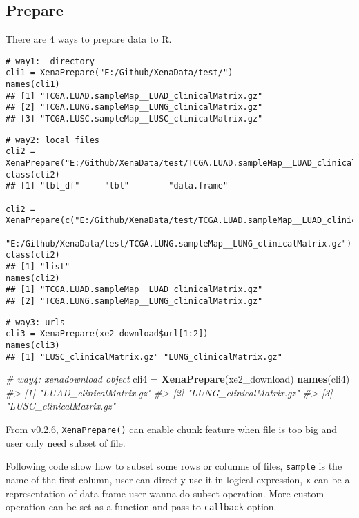 \documentclass[nofonts,]{tufte-handout}
\newenvironment{Shaded}{\begin{snugshade}}{\end{snugshade}}
\newcommand{\CommentTok}[1]{\textcolor[rgb]{0.56,0.35,0.01}{\textit{#1}}}
\newcommand{\KeywordTok}[1]{\textcolor[rgb]{0.13,0.29,0.53}{\textbf{#1}}}
\newcommand{\NormalTok}[1]{#1}
\newcommand{\StringTok}[1]{\textcolor[rgb]{0.31,0.60,0.02}{#1}}
\begin{document}
\hypertarget{prepare}{%
\subsection{Prepare}\label{prepare}}

There are 4 ways to prepare data to R.

\begin{verbatim}
# way1:  directory
cli1 = XenaPrepare("E:/Github/XenaData/test/")
names(cli1)
## [1] "TCGA.LUAD.sampleMap__LUAD_clinicalMatrix.gz"
## [2] "TCGA.LUNG.sampleMap__LUNG_clinicalMatrix.gz"
## [3] "TCGA.LUSC.sampleMap__LUSC_clinicalMatrix.gz"
\end{verbatim}

\begin{verbatim}
# way2: local files
cli2 = XenaPrepare("E:/Github/XenaData/test/TCGA.LUAD.sampleMap__LUAD_clinicalMatrix.gz")
class(cli2)
## [1] "tbl_df"     "tbl"        "data.frame"

cli2 = XenaPrepare(c("E:/Github/XenaData/test/TCGA.LUAD.sampleMap__LUAD_clinicalMatrix.gz",
                     "E:/Github/XenaData/test/TCGA.LUNG.sampleMap__LUNG_clinicalMatrix.gz"))
class(cli2)
## [1] "list"
names(cli2)
## [1] "TCGA.LUAD.sampleMap__LUAD_clinicalMatrix.gz"
## [2] "TCGA.LUNG.sampleMap__LUNG_clinicalMatrix.gz"
\end{verbatim}

\begin{verbatim}
# way3: urls
cli3 = XenaPrepare(xe2_download$url[1:2])
names(cli3)
## [1] "LUSC_clinicalMatrix.gz" "LUNG_clinicalMatrix.gz"
\end{verbatim}

\begin{Shaded}
\begin{Highlighting}[]
\CommentTok{# way4: xenadownload object}
\NormalTok{cli4 =}\StringTok{ }\KeywordTok{XenaPrepare}\NormalTok{(xe2_download)}
\KeywordTok{names}\NormalTok{(cli4)}
\CommentTok{#> [1] "LUAD_clinicalMatrix.gz"}
\CommentTok{#> [2] "LUNG_clinicalMatrix.gz"}
\CommentTok{#> [3] "LUSC_clinicalMatrix.gz"}
\end{Highlighting}
\end{Shaded}

From v0.2.6, \texttt{XenaPrepare()} can enable chunk feature when file
is too big and user only need subset of file.

Following code show how to subset some rows or columns of files,
\texttt{sample} is the name of the first column, user can directly use
it in logical expression, \texttt{x} can be a representation of data
frame user wanna do subset operation. More custom operation can be set
as a function and pass to \texttt{callback} option.
\end{document}
